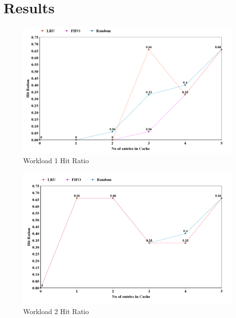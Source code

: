 \documentclass[11pt,pdftex,twocolumn]{article}
\begin{document}
\section{Results}
\label{sec:results}
\begin{figure}[!h]
\centering
\includegraphics[scale=0.3]{images/workload11.png}
\caption{Workload 1 Hit Ratio}
\label{img:w1hr}
\end{figure}

\begin{figure}[!h]
\centering
\includegraphics[scale=0.35]{images/workload21.png}
\caption{Workload 2 Hit Ratio}
\label{img:w2hr}
\end{figure}
\end{document}

